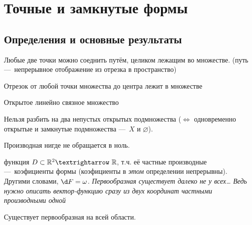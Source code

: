 \documentclass[12pt, a4paper, oneside]{memoir}
\begin{document}
\section{Точные и замкнутые формы}

\subsection{Определения и основные результаты}

\begin{definition}
    Любые две точки можно соеднить путём, целиком лежащим во множестве.
    (путь — непрерывное отображение из отрезка в пространство)
\end{definition}

\begin{definition}
    Отрезок от любой точки множества до центра лежит в множестве
\end{definition}

\begin{definition}[Область]
    Открытое линейно связное множество
\end{definition}

\begin{definition}
    
    Нельзя разбить на два непустых открытых подмножества
    ($\Leftrightarrow$ одновременно открытые и замкнутые подмножества — $X$ и $\varnothing$).
\end{definition}

\begin{definition}
    
    Производная нигде не обращается в ноль.
\end{definition}


\begin{definition}
    функция $D \subset \sR^2 → \sR$, 
    т.ч. её частные производные — коэфициенты формы (коэфициенты в \textit{этом} определении непрерывны).
    Другими словами, $\d F = \omega$. \textit{Первообразная существует далеко не у всех… Ведь нужно описать вектор-функцию сразу из двух координат частными производными одной}
\end{definition}

\begin{definition}
    Существует первообразная на всей области.
\end{definition}
\end{document}
